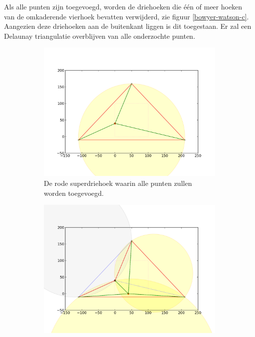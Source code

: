 Als alle punten zijn toegevoegd, worden de driehoeken die één of meer hoeken van de omkaderende vierhoek bevatten verwijderd, zie figuur \ref{bowyer-watson-c}. Aangezien deze driehoeken aan de buitenkant liggen is dit toegestaan. Er zal een Delaunay triangulatie overblijven van alle onderzochte punten.

\begin{figure}
	\center
	\begin{subfigure}{0.4\textwidth}
		\includegraphics[width=\textwidth]{bowyer-watson_superdriehoek}
		\caption{De rode superdriehoek waarin alle punten zullen worden toegevoegd.}
		\label{bowyer-watson-a}
	\end{subfigure}
	\begin{subfigure}{0.4\textwidth}
		\includegraphics[width=\textwidth]{bowyer-watson_nieuwpunt}

\end{subfigure}
\end{figure}
